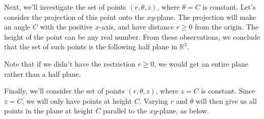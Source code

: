 \documentclass{ximera}
\begin{document}
Next, we'll investigate the set of points $(r,\theta,z)$, where $\theta = C$ is constant. Let's consider the projection of this point onto the $xy$-plane. The projection will make an angle $C$ with the positive $x$-axis, and have distance $r\geq 0$ from the origin. The height of the point can be any real number. From these observations, we conclude that the set of such points is the following half plane in $\mathbb{R}^3$.

\begin{image}
\end{image}

Note that if we didn't have the restriction $r\geq 0$, we would get an entire plane rather than a half plane.

Finally, we'll consider the set of points $(r,\theta, z)$, where $z = C$ is constant. Since $z = C$, we will only have points at height $C$. Varying $r$ and $\theta$ will then give us all points in the plane at height $C$ parallel to the $xy$-plane, as below.
\end{document}
